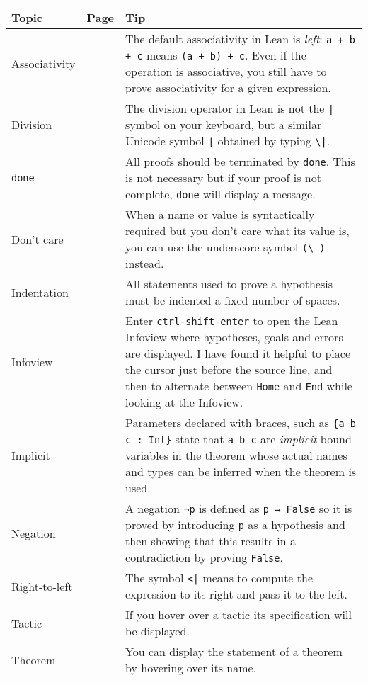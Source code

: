 \begin{tabular}{p{}|r|p{}}
\hline
Topic & Page & Tip\\
\hline
Associativity&\pageref{p.associativity}&The default associativity in Lean is \emph{left}: \verb!a + b + c! means \verb!(a + b) + c!. Even if the operation is associative, you still have to prove associativity for a given expression.\\\hline

Division&\pageref{p.division}&The division operator in Lean is not the \Verb+|+ symbol on your keyboard, but a similar Unicode symbol \Verb+∣+ obtained by typing \Verb+\|+.\\\hline

\Verb+done+&\pageref{p.done}&All proofs should be terminated by \Verb+done+. This is not necessary but if your proof is not complete, \Verb+done+ will display a message.\\\hline

Don't care&\pageref{p.dont-care}&When a name or value is syntactically required but you don't care what its value is, you can use the underscore symbol \Verb+(\_)+ instead.\\\hline

Indentation&\pageref{p.indentation}&All statements used to prove a hypothesis must be indented a fixed number of spaces.\\\hline

Infoview&\pageref{p.infoview}&Enter \Verb+ctrl-shift-enter+ to open the Lean Infoview where hypotheses, goals and errors are displayed. I have found it helpful to place the cursor just before the source line, and then to alternate between \Verb+Home+ and \Verb+End+ while looking at the Infoview.\\\hline

Implicit&\pageref{p.implicit}&Parameters declared with braces, such as \Verb+{a b c : Int}+ state that \Verb+a b c+ are \emph{implicit} bound variables in the theorem whose actual names and types can be inferred when the theorem is used.\\\hline

Negation&\pageref{p.negation}&A negation \Verb+¬p+ is defined as \Verb+p → False+ so it is proved by introducing \Verb+p+ as a hypothesis and then showing that this results in a contradiction by proving \Verb+False+.\\\hline

Right-to-left&\pageref{p.right-to-left}&The symbol \Verb+<|+ means to compute the expression to its right and pass it to the left.\\\hline

Tactic&\pageref{p.tactic}&If you hover over a tactic its specification will be displayed.\\\hline

Theorem&\pageref{p.theorem}&You can display the statement of a theorem by hovering over its name.\\\hline
\end{tabular}

